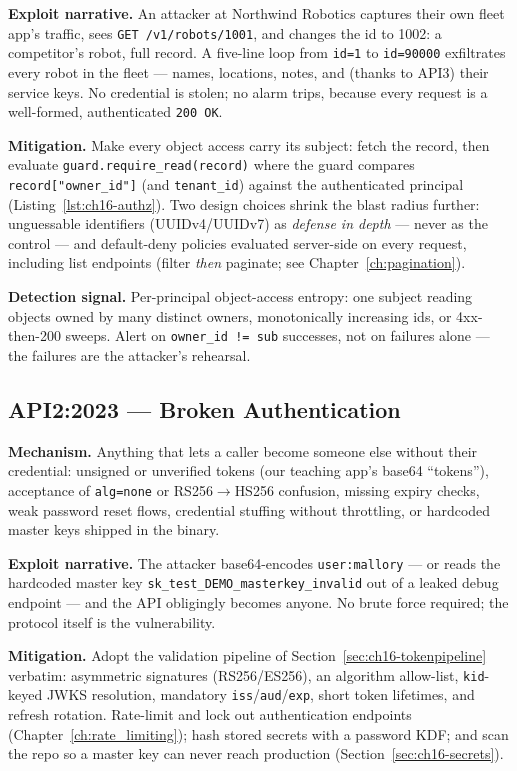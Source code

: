 \textbf{Exploit narrative.} An attacker at Northwind Robotics captures their
own fleet app's traffic, sees \texttt{GET /v1/robots/1001}, and changes the
id to 1002: a competitor's robot, full record. A five-line loop from
\texttt{id=1} to \texttt{id=90000} exfiltrates every robot in the fleet ---
names, locations, notes, and (thanks to API3) their service keys. No
credential is stolen; no alarm trips, because every request is a
well-formed, authenticated \texttt{200 OK}.

\textbf{Mitigation.} Make every object access carry its subject: fetch the
record, then evaluate \texttt{guard.require\_read(record)} where the guard
compares \texttt{record["owner\_id"]} (and \texttt{tenant\_id}) against the
authenticated principal (Listing~\ref{lst:ch16-authz}). Two design choices
shrink the blast radius further: unguessable identifiers (UUIDv4/UUIDv7) as
\emph{defense in depth} --- never as the control --- and default-deny
policies evaluated server-side on every request, including list endpoints
(filter \emph{then} paginate; see Chapter~\ref{ch:pagination}).

\textbf{Detection signal.} Per-principal object-access entropy: one subject
reading objects owned by many distinct owners, monotonically increasing
ids, or 4xx-then-200 sweeps. Alert on \texttt{owner\_id != sub} successes,
not on failures alone --- the failures are the attacker's rehearsal.

\subsection{API2:2023 --- Broken Authentication}
\label{sec:ch16-api2}

\textbf{Mechanism.} Anything that lets a caller become someone else without
their credential: unsigned or unverified tokens (our teaching app's
base64 ``tokens''), acceptance of \texttt{alg=none} or RS256$\to$HS256
confusion, missing expiry checks, weak password reset flows, credential
stuffing without throttling, or hardcoded master keys shipped in the binary.

\textbf{Exploit narrative.} The attacker base64-encodes
\texttt{user:mallory} --- or reads the hardcoded master key
\texttt{sk\_test\_DEMO\_masterkey\_invalid} out of a leaked debug endpoint
--- and the API obligingly becomes anyone. No brute force required; the
protocol itself is the vulnerability.

\textbf{Mitigation.} Adopt the validation pipeline of
Section~\ref{sec:ch16-tokenpipeline} verbatim: asymmetric signatures
(RS256/ES256), an algorithm allow-list, \texttt{kid}-keyed JWKS resolution,
mandatory \texttt{iss}/\texttt{aud}/\texttt{exp}, short token lifetimes,
and refresh rotation. Rate-limit and lock out authentication endpoints
(Chapter~\ref{ch:rate_limiting}); hash stored secrets with a password KDF;
and scan the repo so a master key can never reach production
(Section~\ref{sec:ch16-secrets}).

